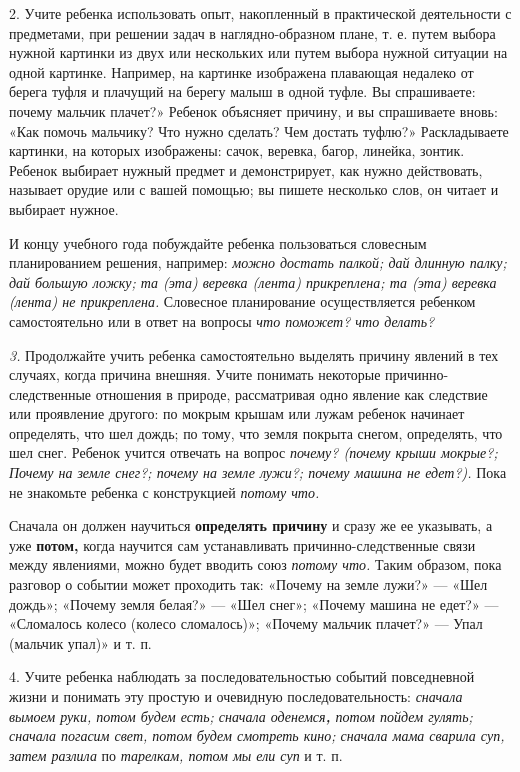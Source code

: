 \documentclass[a5paper]{book}
\renewcommand{\emph}[1]{\textit{#1}}
\begin{document}
2. Учите ребенка использовать опыт, накопленный в практической
деятельности с предметами, при решении задач в наглядно-образном плане,
т. е. путем выбора нужной картинки из двух или нескольких или путем
выбора нужной ситуации на одной картинке. Например, на картинке
изображена плавающая недалеко от берега туфля и плачущий на берегу малыш
в одной туфле. Вы спрашиваете: почему мальчик плачет?» Ребенок объясняет
причину, и вы спрашиваете вновь: «Как помочь мальчику? Что нужно
сделать? Чем достать туфлю?» Раскладываете картинки, на которых
изображены: сачок, веревка, багор, линейка, зонтик. Ребенок выбирает
нужный предмет и демонстрирует, как нужно действовать, называет орудие
или с вашей помощью; вы пишете несколько слов, он читает и выбирает
нужное.

И концу учебного года побуждайте ребенка пользоваться словесным
планированием решения, например: \emph{можно достать палкой; дай длинную
палку; дай большую ложку; та (эта) веревка (лента) прикреплена; та (эта)
веревка (лента) не прикреплена.} Словесное планирование осуществляется
ребенком самостоятельно или в ответ на вопросы \emph{что поможет? что
делать?}

\emph{3.} Продолжайте учить ребенка самостоятельно выделять причину
явлений в тех случаях, когда причина внешняя. Учите понимать некоторые
причинно-следственные отношения в природе, рассматривая одно явление как
следствие или проявление другого: по мокрым крышам или лужам ребенок
начинает определять, что шел дождь; по тому, что земля покрыта снегом,
определять, что шел снег. Ребенок учится отвечать на вопрос
\emph{почему? (почему крыши мокрые?; Почему на земле снег?; почему на
земле лужи?; почему машина не едет?).} Пока не знакомьте ребенка с
конструкцией \emph{потому что.}

Сначала он должен научиться \textbf{определять причину} и сразу же ее
указывать, а уже \textbf{потом,} когда научится сам устанавливать
причинно-следственные связи между явлениями, можно будет вводить союз
\emph{потому что.} Таким образом, пока разговор о событии может
проходить так: «Почему на земле лужи?» --- «Шел дождь»; «Почему земля
белая?» --- «Шел снег»; «Почему машина не едет?» --- «Сломалось колесо
(колесо сломалось)»; «Почему мальчик плачет?» --- Упал (мальчик упал)» и
т. п.

4. Учите ребенка наблюдать за последовательностью событий повседневной
жизни и понимать эту простую и очевидную последовательность:
\emph{сначала вымоем руки, потом будем есть; сначала оденемся\textbf{,}
потом пойдем гулять; сначала погасим свет, потом будем смотреть кино;
сначала мама сварила суп, затем разлила} по \emph{тарелкам, потом мы ели
суп} и т. п.
\end{document}
